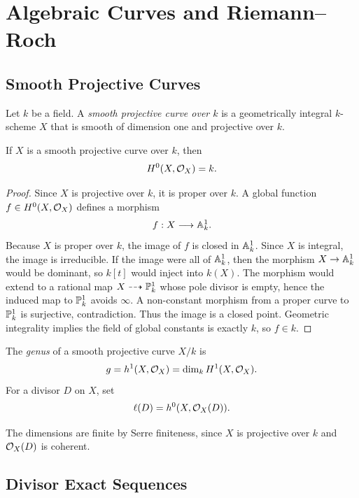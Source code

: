 \chapter{Algebraic Curves and Riemann--Roch}

\section{Smooth Projective Curves}

\begin{definition}
Let \(k\) be a field.  A \emph{smooth projective curve over \(k\)} is a
geometrically integral \(k\)-scheme \(X\) that is smooth of dimension one and
projective over \(k\).
\end{definition}

\begin{proposition}
If \(X\) is a smooth projective curve over \(k\), then
\[
    H^0(X,\OO_X)=k.
\]
\end{proposition}

\begin{proof}
Since \(X\) is projective over \(k\), it is proper over \(k\).  A global
function \(f\in H^0(X,\OO_X)\) defines a morphism
\[
    f:X\longrightarrow \AA^1_k.
\]
Because \(X\) is proper over \(k\), the image of \(f\) is closed in
\(\AA^1_k\).  Since \(X\) is integral, the image is irreducible.  If the image
were all of \(\AA^1_k\), then the morphism \(X\to\AA^1_k\) would be dominant,
so \(k[t]\) would inject into \(k(X)\).  The morphism would extend to a
rational map \(X\dashrightarrow \PP^1_k\) whose pole divisor is empty, hence
the induced map to \(\PP^1_k\) avoids \(\infty\).  A non-constant morphism from
a proper curve to \(\PP^1_k\) is surjective, contradiction.  Thus the image is
a closed point.  Geometric integrality implies the field of global constants is
exactly \(k\), so \(f\in k\).
\end{proof}

\begin{definition}
The \emph{genus} of a smooth projective curve \(X/k\) is
\[
    g=h^1(X,\OO_X)=\dim_k H^1(X,\OO_X).
\]
For a divisor \(D\) on \(X\), set
\[
    \ell(D)=h^0(X,\OO_X(D)).
\]
\end{definition}

\begin{remark}
The dimensions are finite by Serre finiteness, since \(X\) is projective over
\(k\) and \(\OO_X(D)\) is coherent.
\end{remark}

\section{Divisor Exact Sequences}

